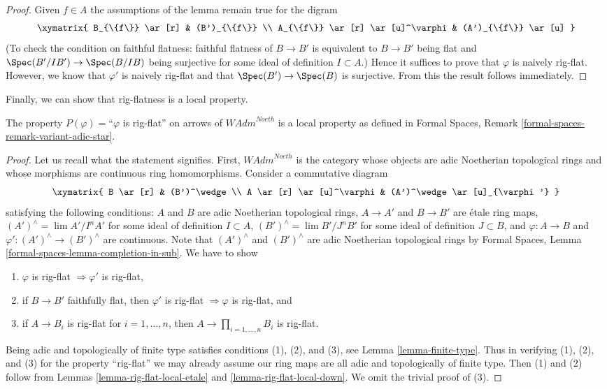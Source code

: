 \begin{proof}
Given $f \in A$ the assumptions of the lemma remain true for the digram
$$
\xymatrix{
B_{\{f\}} \ar[r] & (B')_{\{f\}} \\
A_{\{f\}} \ar[r] \ar[u]^\varphi & (A')_{\{f\}} \ar[u]
}
$$
(To check the condition on faithful flatness: faithful flatness
of $B \to B'$ is equivalent to $B \to B'$ being flat and
$\Spec(B'/IB') \to \Spec(B/IB)$ being
surjective for some ideal of definition $I \subset A$.)
Hence it suffices to prove that $\varphi$ is naively rig-flat.
However, we know that $\varphi'$ is naively rig-flat and
that $\Spec(B') \to \Spec(B)$ is surjective. From this the
result follows immediately.
\end{proof}

\noindent
Finally, we can show that rig-flatness is a local property.

\begin{lemma}
\label{lemma-rig-flat-axioms}
The property $P(\varphi)=$``$\varphi$ is rig-flat'' on arrows
of $\textit{WAdm}^{Noeth}$ is a local property as defined in
Formal Spaces, Remark \ref{formal-spaces-remark-variant-adic-star}.
\end{lemma}

\begin{proof}
Let us recall what the statement signifies. First, 
$\textit{WAdm}^{Noeth}$ is the category whose objects are
adic Noetherian topological rings and whose morphisms are
continuous ring homomorphisms. Consider a commutative diagram
$$
\xymatrix{
B \ar[r] & (B')^\wedge \\
A \ar[r] \ar[u]^\varphi & (A')^\wedge \ar[u]_{\varphi'}
}
$$
satisfying the following conditions:
$A$ and $B$ are adic Noetherian topological rings,
$A \to A'$ and $B \to B'$ are \'etale ring maps,
$(A')^\wedge = \lim A'/I^nA'$ for some ideal of definition $I \subset A$,
$(B')^\wedge = \lim B'/J^nB'$ for some ideal of definition $J \subset B$, and
$\varphi : A \to B$ and $\varphi' : (A')^\wedge \to (B')^\wedge$
are continuous. Note that $(A')^\wedge$ and $(B')^\wedge$ are
adic Noetherian topological rings by
Formal Spaces, Lemma \ref{formal-spaces-lemma-completion-in-sub}.
We have to show
\begin{enumerate}
\item $\varphi$ is rig-flat $\Rightarrow \varphi'$ is rig-flat,
\item if $B \to B'$ faithfully flat, then $\varphi'$ is rig-flat
$\Rightarrow \varphi$ is rig-flat, and
\item if $A \to B_i$ is rig-flat for $i = 1, \ldots, n$, then
$A \to \prod_{i = 1, \ldots, n} B_i$ is rig-flat.
\end{enumerate}
Being adic and topologically of finite type satisfies
conditions (1), (2), and (3), see Lemma \ref{lemma-finite-type}.
Thus in verifying (1), (2), and (3) for the property
``rig-flat'' we may already assume our ring maps are all adic
and topologically of finite type. Then (1) and (2) follow
from Lemmas \ref{lemma-rig-flat-local-etale} and
\ref{lemma-rig-flat-local-down}.
We omit the trivial proof of (3).
\end{proof}

